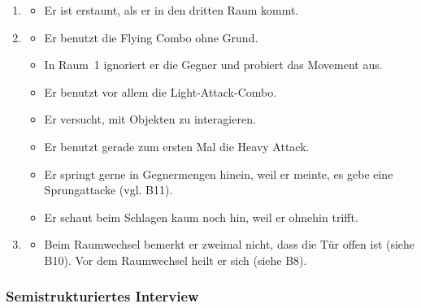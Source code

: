 \documentclass[../Main.tex]{subfiles}
\begin{document}
\begin{enumerate}[label=\textbf{B\arabic*}, leftmargin=1.5cm, itemsep=0.8em, resume]
\begin{itemize}[nosep]
    \item Er findet die Ästhetik schön.
    \item Er wünscht sich einen Block.
    \item Er findet das Movement richtig cool und meint, es habe eine Lernkurve.
    \item Er findet die Animationen des Heavy Soldiers und des Chain Archers cool.
\end{itemize}
\item
\begin{itemize}[nosep]
    \item Er ist erstaunt, als er in den dritten Raum kommt.
\end{itemize}
\item
\begin{itemize}[nosep]
    \item Er benutzt die Flying Combo ohne Grund.
    \item In Raum~1 ignoriert er die Gegner und probiert das Movement aus.
    \item Er benutzt vor allem die Light-Attack-Combo.
    \item Er versucht, mit Objekten zu interagieren.
    \item Er benutzt gerade zum ersten Mal die Heavy Attack.
    \item Er springt gerne in Gegnermengen hinein, weil er meinte, es gebe eine Sprungattacke (vgl. B11).
    \item Er schaut beim Schlagen kaum noch hin, weil er ohnehin trifft.
\end{itemize}
\item
\begin{itemize}[nosep]
    \item Beim Raumwechsel bemerkt er zweimal nicht, dass die Tür offen ist (siehe B10). Vor dem Raumwechsel heilt er sich (siehe B8).
\end{itemize}
\end{enumerate}

\subsubsection{Semistrukturiertes Interview}
\end{document}
